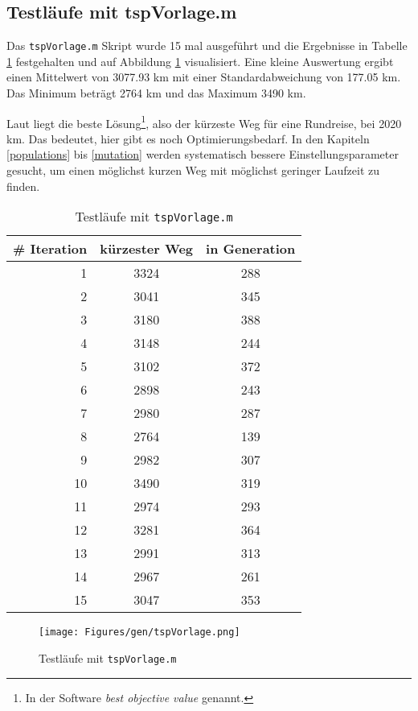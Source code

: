 \subsection{Testläufe mit tspVorlage.m}

Das {\tt tspVorlage.m} Skript wurde 15 mal ausgeführt und die Ergebnisse in
Tabelle \ref{testlaeufe} festgehalten und auf Abbildung \ref{fig.testlaeufe}
visualisiert.
Eine kleine Auswertung ergibt einen Mittelwert von 3077.93 km mit
einer Standardabweichung von 177.05 km.
Das Minimum beträgt 2764 km und das Maximum 3490 km.

Laut \cite{aufg} liegt die beste
Lösung\footnote{In der Software \emph{best objective value} genannt.},
also der kürzeste Weg für eine Rundreise, bei 2020 km.
Das bedeutet, hier gibt es noch Optimierungsbedarf.
In den Kapiteln \ref{populations} bis \ref{mutation} werden systematisch bessere Einstellungsparameter
gesucht, um einen möglichst kurzen Weg mit möglichst geringer Laufzeit zu finden.

\begin{table}[h]
\begin{tabular}{ | r | c | c | }
  \hline
  \# Iteration & kürzester Weg & in Generation \\
  \hline
  1  & 3324 & 288 \\
  2  & 3041 & 345 \\
  3  & 3180 & 388 \\
  4  & 3148 & 244 \\
  5  & 3102 & 372 \\
  6  & 2898 & 243 \\
  7  & 2980 & 287 \\
  8  & 2764 & 139 \\
  9  & 2982 & 307 \\
  10 & 3490 & 319 \\
  11 & 2974 & 293 \\
  12 & 3281 & 364 \\
  13 & 2991 & 313 \\
  14 & 2967 & 261 \\
  15 & 3047 & 353 \\
  \hline
\end{tabular}
\caption{Testläufe mit {\tt tspVorlage.m}}\label{testlaeufe}
\end{table}

\begin{figure}[h!]
  \centering
  \texttt{[image: Figures/gen/tspVorlage.png]}
  \caption{Testläufe mit {\tt tspVorlage.m}}\label{fig.testlaeufe}
\end{figure}


